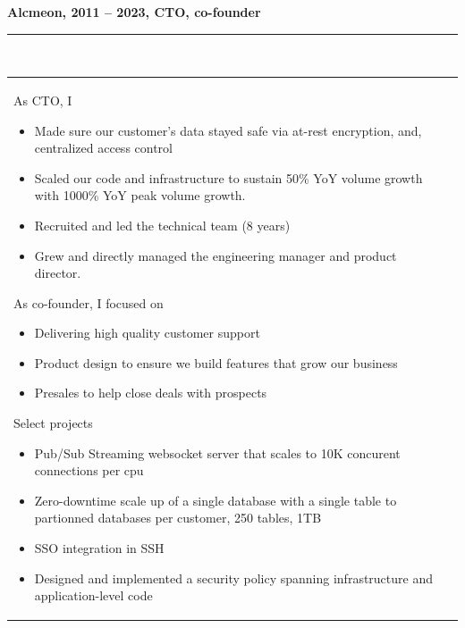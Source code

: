 \documentclass[a4paper,12pt]{article}
\newcommand{\ligne}[1]{\rule[0.5ex]{\textwidth}{#1}\\}
\newcommand{\styleRub}[1]{\textbf{\large #1}\par}
\newcommand{\indentStd}{\noindent\hspace*{10pt}}
\newenvironment{rubrique}[2][\linewidth]%
{\styleRub{#2}%
\ligne{0.5mm}
\setlength{\lenB}{#1}%
\setlength{\lenC}{\linewidth}%
\addtolength{\lenC}{-\lenA}%
\addtolength{\lenC}{-\lenB}%
\addtolength{\lenC}{-19pt}
\indentStd\begin{tabular}[t]{p{\lenB}p{\lenC}}}
{\end{tabular}}
\newlength{\lenA} %
\newlength{\lenB} %
\newlength{\lenC} %
\begin{document}
\vspace{0.5cm}
\begin{rubrique}{Alcmeon, 2011 -- 2023, CTO, co-founder}

As CTO, I 
\begin{itemize}
\item Made sure our customer's data stayed safe via at-rest encryption,
        and, centralized access control
\item Scaled our code and infrastructure to sustain
        50\% YoY volume growth with 1000\% YoY peak volume growth.
\item Recruited and led the technical team (8 years)
\item Grew and directly managed the engineering manager and product
        director.
\end{itemize}


As co-founder, I focused on
\begin{itemize}
\item Delivering high quality customer support
\item Product design to ensure we build features that grow our business
\item Presales to help close deals with prospects
\end{itemize}

Select projects
\begin{itemize}
\item Pub/Sub Streaming websocket server that scales to 10K concurent connections per cpu
\item Zero-downtime scale up of a single database with a single table to partionned
 databases per customer, 250 tables, 1TB
\item SSO integration in SSH
\item Designed and implemented a security policy spanning 
infrastructure and application-level code
\end{itemize}

\end{rubrique}
\pagebreak
\end{document}

